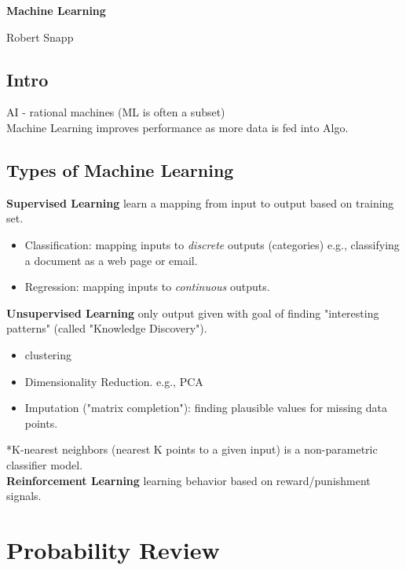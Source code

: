 \documentclass[12pt]{article}
\begin{document}
\newpage

\centerline{\LARGE \textbf{Machine Learning}}
Robert Snapp\\

\subsection*{Intro}
AI - rational machines (ML is often a subset)\\

Machine Learning improves performance as more data is fed into Algo.\\

\subsection*{Types of Machine Learning}
\textbf{Supervised Learning} learn a mapping from input to output based on training set.\\
\begin{itemize}
    \item Classification: mapping inputs to \textit{discrete} outputs (categories)
    e.g., classifying a document as a web page or email.
    \item Regression: mapping inputs to \textit{continuous} outputs.
\end{itemize}
\textbf{Unsupervised Learning} only output given with goal of finding "interesting patterns" (called "Knowledge Discovery").\\
\begin{itemize}
    \item clustering
    \item Dimensionality Reduction. e.g., PCA
    \item Imputation ("matrix completion"): finding plausible values for missing data points.
\end{itemize}

*K-nearest neighbors (nearest K points to a given input) is a non-parametric classifier model.\\
\textbf{Reinforcement Learning} learning behavior based on reward/punishment signals.

\section*{Probability Review}
\end{document}
